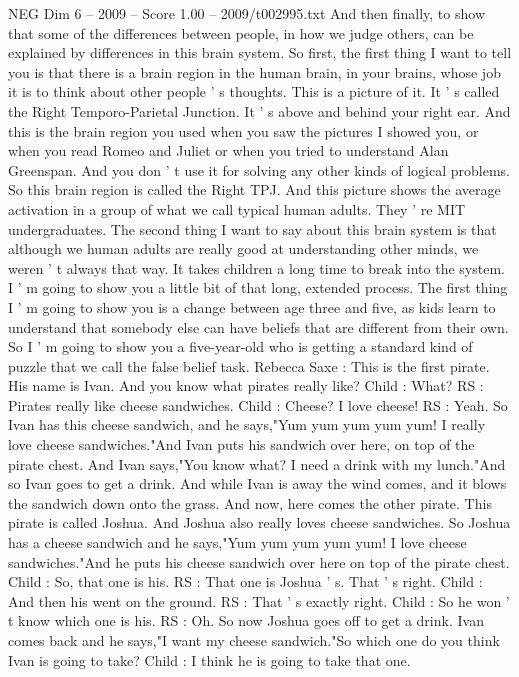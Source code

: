 \begin{textsample}{NEG Dim 6 – 2009 – Score 1.00 – 2009/t002995.txt}
And then finally, to show that some of the differences between people, in how we judge others, can be explained by differences in this brain system.
So first, the first thing I want to tell you is that there is a brain region in the human brain, in your brains, whose job it is to think about other people ' s thoughts.
This is a picture of it.
It ' s called the Right Temporo-Parietal Junction.
It ' s above and behind your right ear.
And this is the brain region you used when you saw the pictures I showed you, or when you read Romeo and Juliet or when you tried to understand Alan Greenspan.
And you don ' t use it for solving any other kinds of logical problems.
So this brain region is called the Right TPJ.
And this picture shows the average activation in a group of what we call typical human adults.
They ' re MIT undergraduates.
The second thing I want to say about this brain system is that although we human adults are really good at understanding other minds, we weren ' t always that way.
It takes children a long time to break into the system.
I ' m going to show you a little bit of that long, extended process.
The first thing I ' m going to show you is a change between age three and five, as kids learn to understand that somebody else can have beliefs that are different from their own.
So I ' m going to show you a five-year-old who is getting a standard kind of puzzle that we call the false belief task.
Rebecca Saxe : This is the first pirate.
His name is Ivan.
And you know what pirates really like?
Child : What?
RS : Pirates really like cheese sandwiches.
Child : Cheese?
I love cheese!
RS : Yeah.
So Ivan has this cheese sandwich, and he says,"Yum yum yum yum yum!
I really love cheese sandwiches."And Ivan puts his sandwich over here, on top of the pirate chest.
And Ivan says,"You know what?
I need a drink with my lunch."And so Ivan goes to get a drink.
And while Ivan is away the wind comes, and it blows the sandwich down onto the grass.
And now, here comes the other pirate.
This pirate is called Joshua.
And Joshua also really loves cheese sandwiches.
So Joshua has a cheese sandwich and he says,"Yum yum yum yum yum!
I love cheese sandwiches."And he puts his cheese sandwich over here on top of the pirate chest.
Child : So, that one is his.
RS : That one is Joshua ' s.
That ' s right.
Child : And then his went on the ground.
RS : That ' s exactly right.
Child : So he won ' t know which one is his.
RS : Oh.
So now Joshua goes off to get a drink.
Ivan comes back and he says,"I want my cheese sandwich."So which one do you think Ivan is going to take?
Child : I think he is going to take that one.

\end{textsample}
